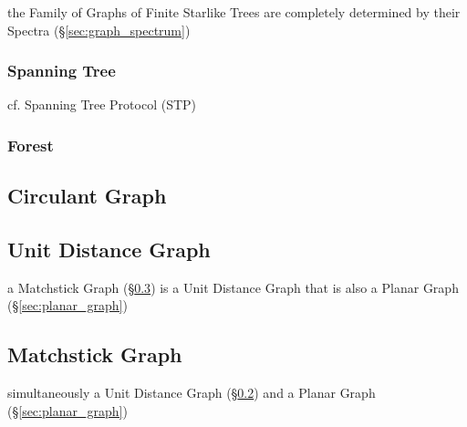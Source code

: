 the Family of Graphs of Finite Starlike Trees are completely determined by
their Spectra (\S\ref{sec:graph_spectrum})



\subsubsection{Spanning Tree}\label{sec:spanning_tree}

cf. Spanning Tree Protocol (STP)



\subsubsection{Forest}\label{sec:forest}



\subsection{Circulant Graph}\label{sec:circulant_graph}

\subsection{Unit Distance Graph}\label{sec:unit_distance_graph}

a Matchstick Graph (\S\ref{sec:matchstick_graph}) is a Unit Distance Graph that
is also a Planar Graph (\S\ref{sec:planar_graph})



\subsection{Matchstick Graph}\label{sec:matchstick_graph}

simultaneously a Unit Distance Graph (\S\ref{sec:unit_distance_graph}) and a
Planar Graph (\S\ref{sec:planar_graph})



